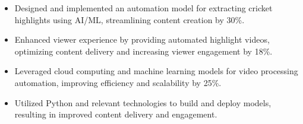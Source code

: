 \documentclass{article}
\begin{document}
\begin{itemize}[noitemsep, topsep=0pt]
\begin{itemize}[noitemsep, topsep=0pt]
                \item Designed and implemented an automation model for extracting cricket highlights using AI/ML, streamlining content creation by 30\%.
                \item Enhanced viewer experience by providing automated highlight videos, optimizing content delivery and increasing viewer engagement by 18\%.
                \item Leveraged cloud computing and machine learning models for video processing automation, improving efficiency and scalability by 25\%.
                \item Utilized Python and relevant technologies to build and deploy models, resulting in improved content delivery and engagement.
            \end{itemize}
    \end{itemize}
    \vspace{1cm}
\end{document}
